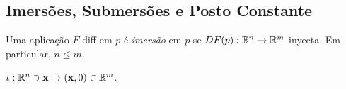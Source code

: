 \subsection{Imersões, Submersões e Posto Constante}

\begin{definition}
    Uma aplicação \(F\) diff em \(p\) é \emph{imersão} em \(p\) se \(DF(p): \mathbb{R}^n \to \mathbb{R}^m\) inyecta. Em particular, \(n\leq m\).
\end{definition}
  
\begin{example} 
    \(\iota : \mathbb{R}^n \ni \textbf{x}\mapsto (\textbf{x}, 0) \in \mathbb{R}^m\). 
\end{example}


